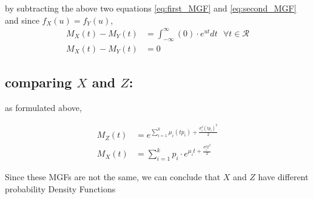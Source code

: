 \documentclass[openany]{book}
\begin{document}
	by subtracting the above two equations \ref{eq:first_MGF} and \ref{eq:second_MGF} and since $f_X(u) = f_Y(u)$,
	\begin{align*}
		M_X(t) - M_Y(t) &= \int_{-\infty}^{\infty}( 0 ) \cdot e^{ut} dt \text{ }\forall t \in \mathcal{R}\\ 
		M_X(t) - M_Y(t) &= 0
	\end{align*}
	
	\subsection*{comparing $X$ and $Z$:}
	as formulated above, 
	
	\begin{align*}
		M_Z(t) &= e^{ \sum_{i=1}^{k} \mu_i (t p_i) + \frac{\sigma_i ^2 (t p_i)^2}{2}} \\
		M_X(t) &= \sum_{i=1}^{k} p_i \cdot e^{\mu_i t + \frac{\sigma_i ^2 t^2}{2}}
	\end{align*}
	
	Since these MGFs are not the same, we can conclude that $X$ and $Z$ have different probability
	Density Functions
\end{document}
